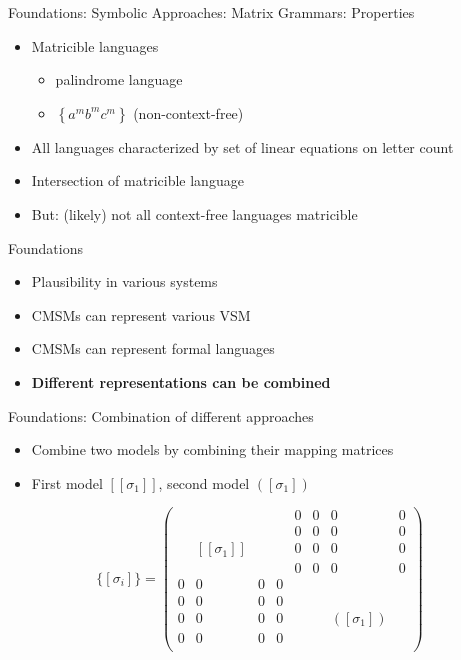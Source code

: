 \documentclass[12pt,a4paper]{beamer}
\newcommand{\setof}[1]{\ensuremath{\left \{ #1 \right \}}}
\begin{document}
\begin{frame}{Foundations: Symbolic Approaches: Matrix Grammars: Properties}
\begin{itemize}
\item Matricible languages
\begin{itemize}
    \item palindrome language
    \item $\setof{ a^{m} b ^{m} c^{m}  }$ (non-context-free)
\end{itemize}
\item All languages characterized by set of linear equations on letter count
\item Intersection of matricible language
\item But: (likely) not all context-free languages matricible
\end{itemize}
\end{frame}



\begin{frame}{Foundations}
\begin{itemize}
\item Plausibility in various systems
\item CMSMs can represent various VSM
\item CMSMs can represent formal languages
\item \textbf{Different representations can be combined}
\end{itemize}
\end{frame}


\begin{frame}{Foundations: Combination of different approaches}
\begin{itemize}
\item Combine two models by combining their mapping matrices
\item First model $[[\sigma_{1}]]$, second model $([\sigma_{1}])$
\end{itemize}

$$  \{[\sigma_{i}]\} =
\left( \begin{array}{cccc|cccc}
 &  &  &  & 0 & 0 & 0 & 0   \\
 &  &  &  & 0 & 0 & 0 & 0   \\
 & [[\sigma_{1}]]  &  &  & 0 & 0 & 0 & 0   \\
 &  &  &  & 0 & 0 & 0 & 0   \\ \hline
0 & 0 & 0 & 0 &  &  &  &    \\
0 & 0 & 0 & 0 &  &  &  &    \\
0 & 0 & 0 & 0 &  &  & ([\sigma_{1}])  &    \\
0 & 0 & 0 & 0 &  &  &  &    \\
\end{array} \right) $$


\end{frame}
\end{document}
